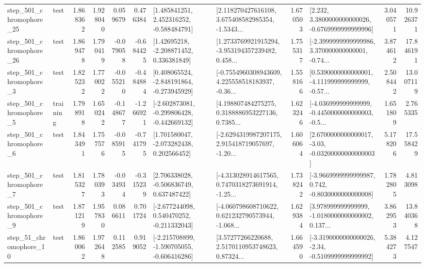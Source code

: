 \begin{tabular}{llrrrrllrlrr}
  step\_501\_chromophore\_25 &      test &      1.868362 &    1.928040 &      0.059679 &  0.476384 &    [1.485841251, 2.452316252, -0.588484791] &  [2.118270427616108, 3.675408582985354, -1.5343... &       1.670503 &   [2.232, 3.3800000000000026, -0.6769999999999996] &            3.040571 &         10.926371 \\
  step\_501\_chromophore\_26 &      test &      1.869478 &    1.790419 &     -0.079058 & -0.684425 &     [1.42695218, -2.208871452, 0.336381849] &  [1.2733769921915294, -3.953194357239482, 0.458... &       1.755317 &  [-2.3999999999999986, 3.370000000000001, -0.74... &            3.874612 &         17.846191 \\
   step\_501\_chromophore\_3 &      test &      1.825232 &    1.770022 &     -0.055210 & -0.484884 &   [0.408065524, -2.848191864, -0.273945929] &  [-0.7554960308943609, 4.225558518183937, -0.36... &       1.558166 &  [0.5390000000000001, -4.111999999999999, -0.57... &            2.508442 &         13.007119 \\
   step\_501\_chromophore\_5 &  training &      1.798918 &    1.650242 &     -0.148677 & -1.266921 &  [-2.602873081, -0.299806428, -0.442669132] &  [4.198807484275275, 0.3188886953227136, 0.7385... &       1.623246 &  [-4.036999999999999, -0.4450000000000003, -0.5... &            1.651809 &          2.765335 \\
   step\_501\_chromophore\_6 &      test &      1.843491 &    1.757576 &     -0.085915 & -0.741795 &    [1.701580047, -2.073282438, 0.202566452] &  [-2.6294319987207175, 2.915418719057697, -1.20... &       1.606064 &  [2.6700000000000017, -3.03, -0.03200000000000003] &            5.178206 &         17.558429 \\
   step\_501\_chromophore\_7 &      test &      1.815327 &    1.780393 &     -0.034934 & -0.315239 &    [2.706338028, -0.506836749, 0.637487422] &  [-4.313028914617565, 0.7470318273691914, -1.25... &       1.738242 &  [-3.9669999999999987, 0.742, -0.8030000000000008] &            1.782805 &          4.813098 \\
   step\_501\_chromophore\_9 &      test &      1.871219 &    1.957830 &      0.086611 &  0.701724 &   [-2.677244098, 0.540470252, -0.211332043] &  [-4.060798608710622, 0.621232790573944, -1.068... &       1.629384 &  [3.978999999999999, -1.0180000000000002, 0.137... &            3.862953 &         13.840368 \\
   step\_51\_chromophore\_10 &      test &      1.860062 &    1.972648 &      0.112585 &  0.919052 &  [-2.215708899, -1.590705055, -0.606416286] &  [3.57277266220688, 2.5170110953748623, 0.87324... &       1.664590 &  [-3.3190000000000026, -2.34, -0.5109999999999992] &            5.384273 &          4.127547 \\

\end{tabular}
